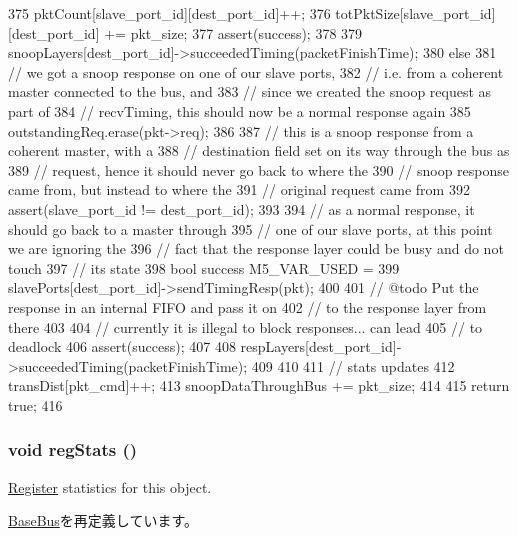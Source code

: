 \begin{DoxyCode}
{{375         pktCount[slave_port_id][dest_port_id]++;
376         totPktSize[slave_port_id][dest_port_id] += pkt_size;
377         assert(success);
378 
379         snoopLayers[dest_port_id]->succeededTiming(packetFinishTime);
380     } else {
381         // we got a snoop response on one of our slave ports,
382         // i.e. from a coherent master connected to the bus, and
383         // since we created the snoop request as part of
384         // recvTiming, this should now be a normal response again
385         outstandingReq.erase(pkt->req);
386 
387         // this is a snoop response from a coherent master, with a
388         // destination field set on its way through the bus as
389         // request, hence it should never go back to where the
390         // snoop response came from, but instead to where the
391         // original request came from
392         assert(slave_port_id != dest_port_id);
393 
394         // as a normal response, it should go back to a master through
395         // one of our slave ports, at this point we are ignoring the
396         // fact that the response layer could be busy and do not touch
397         // its state
398         bool success M5_VAR_USED =
399             slavePorts[dest_port_id]->sendTimingResp(pkt);
400 
401         // @todo Put the response in an internal FIFO and pass it on
402         // to the response layer from there
403 
404         // currently it is illegal to block responses... can lead
405         // to deadlock
406         assert(success);
407 
408         respLayers[dest_port_id]->succeededTiming(packetFinishTime);
409     }
410 
411     // stats updates
412     transDist[pkt_cmd]++;
413     snoopDataThroughBus += pkt_size;
414 
415     return true;
416 }
\end{DoxyCode}
\hypertarget{classCoherentBus_a4dc637449366fcdfc4e764cdf12d9b11}{
\subsubsection[{regStats}]{\setlength{\rightskip}{0pt plus 5cm}void regStats ()}}
\label{classCoherentBus_a4dc637449366fcdfc4e764cdf12d9b11}
\hyperlink{classRegister}{Register} statistics for this object. 

\hyperlink{classBaseBus_a4dc637449366fcdfc4e764cdf12d9b11}{BaseBus}を再定義しています。


